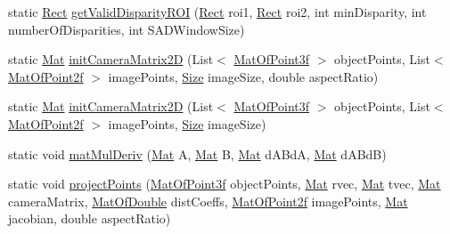 \begin{DoxyCompactItemize}
static \mbox{\hyperlink{classorg_1_1opencv_1_1core_1_1_rect}{Rect}} \mbox{\hyperlink{classorg_1_1opencv_1_1calib3d_1_1_calib3d_a48c12be1bc3f11177e060cbd807ab92e}{get\+Valid\+Disparity\+R\+OI}} (\mbox{\hyperlink{classorg_1_1opencv_1_1core_1_1_rect}{Rect}} roi1, \mbox{\hyperlink{classorg_1_1opencv_1_1core_1_1_rect}{Rect}} roi2, int min\+Disparity, int number\+Of\+Disparities, int S\+A\+D\+Window\+Size)
\item 
static \mbox{\hyperlink{classorg_1_1opencv_1_1core_1_1_mat}{Mat}} \mbox{\hyperlink{classorg_1_1opencv_1_1calib3d_1_1_calib3d_a15df47d3a4b4a3ef48f13d1c09aae9cb}{init\+Camera\+Matrix2D}} (List$<$ \mbox{\hyperlink{classorg_1_1opencv_1_1core_1_1_mat_of_point3f}{Mat\+Of\+Point3f}} $>$ object\+Points, List$<$ \mbox{\hyperlink{classorg_1_1opencv_1_1core_1_1_mat_of_point2f}{Mat\+Of\+Point2f}} $>$ image\+Points, \mbox{\hyperlink{classorg_1_1opencv_1_1core_1_1_size}{Size}} image\+Size, double aspect\+Ratio)
\item 
static \mbox{\hyperlink{classorg_1_1opencv_1_1core_1_1_mat}{Mat}} \mbox{\hyperlink{classorg_1_1opencv_1_1calib3d_1_1_calib3d_a6f6b4970eeeaa930d31f4a6f8dc5ea5f}{init\+Camera\+Matrix2D}} (List$<$ \mbox{\hyperlink{classorg_1_1opencv_1_1core_1_1_mat_of_point3f}{Mat\+Of\+Point3f}} $>$ object\+Points, List$<$ \mbox{\hyperlink{classorg_1_1opencv_1_1core_1_1_mat_of_point2f}{Mat\+Of\+Point2f}} $>$ image\+Points, \mbox{\hyperlink{classorg_1_1opencv_1_1core_1_1_size}{Size}} image\+Size)
\item 
static void \mbox{\hyperlink{classorg_1_1opencv_1_1calib3d_1_1_calib3d_ac74d1c19f77ac11af4ec2e92df9cacf9}{mat\+Mul\+Deriv}} (\mbox{\hyperlink{classorg_1_1opencv_1_1core_1_1_mat}{Mat}} A, \mbox{\hyperlink{classorg_1_1opencv_1_1core_1_1_mat}{Mat}} B, \mbox{\hyperlink{classorg_1_1opencv_1_1core_1_1_mat}{Mat}} d\+A\+BdA, \mbox{\hyperlink{classorg_1_1opencv_1_1core_1_1_mat}{Mat}} d\+A\+BdB)
\item 
static void \mbox{\hyperlink{classorg_1_1opencv_1_1calib3d_1_1_calib3d_a5461d27f043f4a420fea1fac01a745e4}{project\+Points}} (\mbox{\hyperlink{classorg_1_1opencv_1_1core_1_1_mat_of_point3f}{Mat\+Of\+Point3f}} object\+Points, \mbox{\hyperlink{classorg_1_1opencv_1_1core_1_1_mat}{Mat}} rvec, \mbox{\hyperlink{classorg_1_1opencv_1_1core_1_1_mat}{Mat}} tvec, \mbox{\hyperlink{classorg_1_1opencv_1_1core_1_1_mat}{Mat}} camera\+Matrix, \mbox{\hyperlink{classorg_1_1opencv_1_1core_1_1_mat_of_double}{Mat\+Of\+Double}} dist\+Coeffs, \mbox{\hyperlink{classorg_1_1opencv_1_1core_1_1_mat_of_point2f}{Mat\+Of\+Point2f}} image\+Points, \mbox{\hyperlink{classorg_1_1opencv_1_1core_1_1_mat}{Mat}} jacobian, double aspect\+Ratio)

\end{DoxyCompactItemize}
